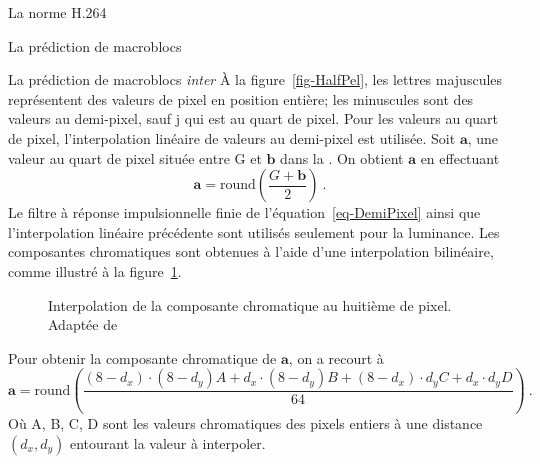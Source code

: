 \begin{chapter}{La norme H.264}
\begin{section}{La prédiction de macroblocs}
\begin{subsection}{La prédiction de macroblocs \textit{inter}}
À la figure~\ref{fig-HalfPel}, les lettres majuscules représentent des valeurs
de pixel en position entière; les minuscules sont des valeurs au demi-pixel,
sauf j qui est au quart de pixel. Pour les valeurs au quart de pixel,
l'interpolation linéaire de valeurs au demi-pixel est utilisée. Soit
$\mathbf{a}$, une valeur au quart de pixel située entre G et $\mathbf{b}$ dans
la . On obtient $\mathbf{a}$ en effectuant
\begin{equation}
\mathbf{a} = \text{round} \left(\frac{G + \mathbf{b} }{2} \right)\:.
\end{equation}
Le filtre à réponse impulsionnelle finie de l'équation~\ref{eq-DemiPixel} ainsi
que l'interpolation linéaire précédente sont utilisés seulement pour la
luminance. Les composantes chromatiques sont obtenues à l'aide d'une
interpolation bilinéaire, comme illustré à la figure~\ref{fig-ChromaPel}.

\begin{figure}
\centering {}
\caption[Interpolation de la composante chromatique]{Interpolation de la
composante chromatique au huitième de pixel. \\Adaptée de
\citet[p.~175]{richardson2003}}
\label{fig-ChromaPel}
\end{figure}

Pour obtenir la composante chromatique de $\mathbf{a}$, on a recourt à
{\small\begin{equation}
\mathbf{a} = \text{round} \left( \frac{(8 - d_x) \cdot (8-d_y)A + d_x \cdot (8 -
d_y)B + (8 - d_x) \cdot d_yC + d_x \cdot d_yD}{64} \right)\:.
\end{equation}}
Où A, B, C, D sont les valeurs chromatiques des pixels entiers à une distance
$(d_x,d_y)$ entourant la valeur à interpoler.
\end{subsection}


\end{section}
\end{chapter}
